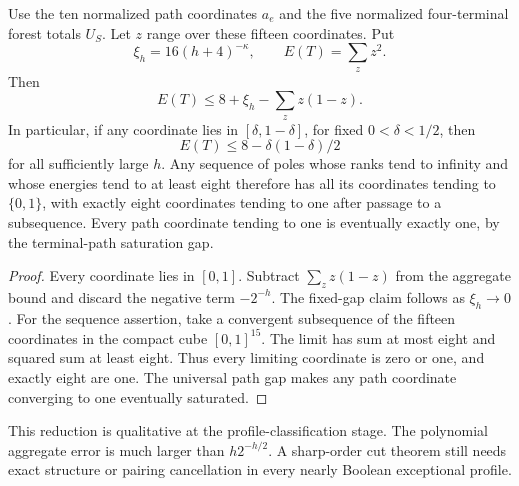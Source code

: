 \begin{corollary}
\label{cor:five-pole-nearly-boolean}
Use the ten normalized path coordinates $a_e$ and the five normalized four-terminal forest totals $U_S$.
Let $z$ range over these fifteen coordinates.
Put
\[
 \xi_h=16(h+4)^{-\kappa},\qquad E(T)=\sum_z z^2.
\]
Then
\[
 E(T)\le8+\xi_h-\sum_z z(1-z).
\]
In particular, if any coordinate lies in $[\delta,1-\delta]$, for fixed $0<\delta<1/2$, then
\[
 E(T)\le8-\delta(1-\delta)/2
\]
for all sufficiently large $h$.
Any sequence of poles whose ranks tend to infinity and whose energies tend to at least eight therefore has all its coordinates tending to $\{0,1\}$, with exactly eight coordinates tending to one after passage to a subsequence.
Every path coordinate tending to one is eventually exactly one, by the terminal-path saturation gap.
\end{corollary}

\begin{proof}
Every coordinate lies in $[0,1]$.
Subtract $\sum_z z(1-z)$ from the aggregate bound and discard the negative term $-2^{-h}$.
The fixed-gap claim follows as $\xi_h\to0$.
For the sequence assertion, take a convergent subsequence of the fifteen coordinates in the compact cube $[0,1]^{15}$.
The limit has sum at most eight and squared sum at least eight.
Thus every limiting coordinate is zero or one, and exactly eight are one.
The universal path gap makes any path coordinate converging to one eventually saturated.
\end{proof}

This reduction is qualitative at the profile-classification stage.
The polynomial aggregate error is much larger than $h2^{-h/2}$.
A sharp-order cut theorem still needs exact structure or pairing cancellation in every nearly Boolean exceptional profile.
